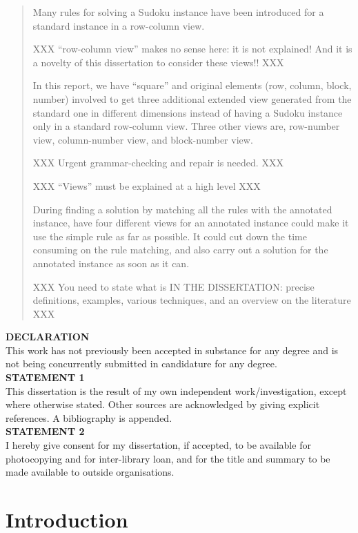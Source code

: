 \documentclass[11pt]{report}
\begin{document}
\begin{abstract}
Many rules for solving a Sudoku instance have been introduced for a standard instance in a row-column view.

XXX ``row-column view'' makes no sense here: it is not explained! And it is a
novelty of this dissertation to consider these views!! XXX

 In this report, we have ``square'' and original elements (row, column, block, number) involved to get three additional extended view generated from the standard one in different dimensions instead of having a Sudoku instance only in a standard row-column view. Three other views are, row-number view, column-number view, and block-number view.

XXX Urgent grammar-checking and repair is needed. XXX

XXX ``Views'' must be explained at a high level XXX

During finding a solution by matching all the rules with the annotated instance, have four different views for an annotated instance could make it use the simple rule as far as possible. It could cut down the time consuming on the rule matching, and also carry out a solution for the annotated instance as soon as it can.

XXX You need to state what is IN THE DISSERTATION: precise definitions, examples, various techniques, and an overview on the literature XXX
\end{abstract}


\textbf{DECLARATION}\\
This work has not previously been accepted in substance for any degree and is not being concurrently submitted in candidature for any degree.\\
\textbf{STATEMENT 1}\\
This dissertation is the result of my own independent work/investigation, except where otherwise stated. Other sources are acknowledged by giving explicit references. A bibliography is appended.\\
\textbf{STATEMENT 2}\\
I hereby give consent for my dissertation, if accepted, to be available for photocopying and for inter-library loan, and for the title and summary to be made available to outside organisations.


\tableofcontents



\chapter{Introduction}
\label{cha:Introduction}
\end{document}
